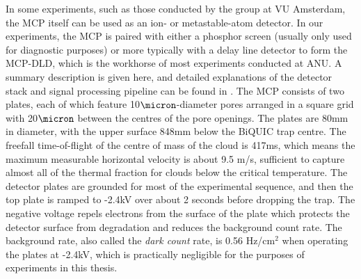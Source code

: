 	In some experiments, such as those conducted by the \mhe group at VU Amsterdam, the MCP itself can be used as an ion- or metastable-atom detector.
	In our experiments, the MCP is paired with either a phosphor screen (usually only used for diagnostic purposes) or more typically with a delay line detector to form the MCP-DLD, which is the workhorse of most experiments conducted at ANU.
	A summary description is given here, and detailed explanations of the detector stack and signal processing pipeline can be found in \cite{ShinThesis, HodgmanThesis, ManningThesis}.
	The MCP consists of two plates, each of which feature 10$\micron$-diameter pores arranged in a square grid with 20$\micron$ between the centres of the pore openings.
	The plates are 80mm in diameter, with the upper surface 848mm below the BiQUIC trap centre.
	The freefall time-of-flight of the centre of mass of the cloud is 417ms, which means the maximum measurable horizontal velocity is about 9.5 m/s, sufficient to capture almost all of the thermal fraction for clouds below the critical temperature.
	The detector plates are grounded for most of the experimental sequence, and then the top plate is ramped to -2.4kV over about 2 seconds before dropping the trap.
	The negative voltage repels electrons from the surface of the plate which protects the detector surface from degradation and reduces the background count rate.
	The background rate, also called the \emph{dark count} rate, is 0.56 Hz/cm$^2$ when operating the plates at -2.4kV, which is practically negligible for the purposes of experiments in this thesis.
	

